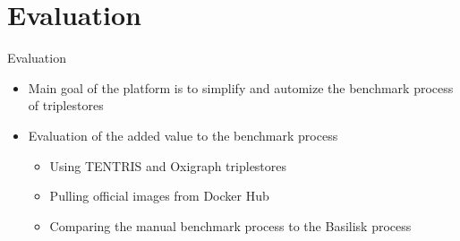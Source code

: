 \section{Evaluation}
\begin{frame}{Evaluation}
	
	\begin{itemize}
		\item Main goal of the platform is to simplify and automize the benchmark process of triplestores
		
		\item Evaluation of the added value to the benchmark process
		\begin{itemize}
			\item Using TENTRIS and Oxigraph triplestores
			
			\item Pulling official images from Docker Hub
			
			\item Comparing the manual benchmark process to the Basilisk process
		\end{itemize}
		
	\end{itemize}
	
	
\end{frame}

